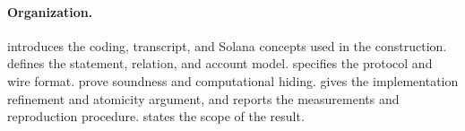 \paragraph{Organization.}
 introduces the coding, transcript, and Solana concepts
used in the construction.   defines the statement, relation,
and account model.   specifies the protocol and wire
format.   prove soundness and computational
hiding.
 gives the implementation refinement and atomicity
argument, and  reports the measurements and reproduction
procedure.   states the scope of the result.
